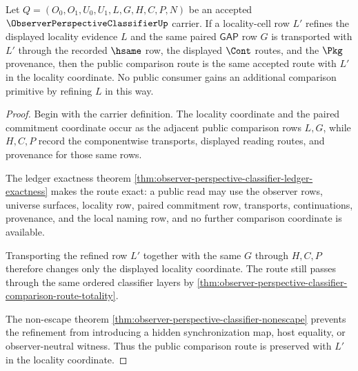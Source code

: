 \begin{theorem}
\label{thm:observer-perspective-classifier-locality-refinement}
Let $Q=(O_0,O_1,U_0,U_1,L,G,H,C,P,N)$ be an accepted $\ObserverPerspectiveClassifierUp$ carrier. If a locality-cell row $L'$ refines the displayed locality evidence $L$ and the same paired $\mathsf{GAP}$ row $G$ is transported with $L'$ through the recorded $\hsame$ row, the displayed $\Cont$ routes, and the $\Pkg$ provenance, then the public comparison route is the same accepted route with $L'$ in the locality coordinate. No public consumer gains an additional comparison primitive by refining $L$ in this way.
\end{theorem}
\begin{proof}
Begin with the carrier definition. The locality coordinate and the paired commitment coordinate occur as the adjacent public comparison rows $L,G$, while $H,C,P$ record the componentwise transports, displayed reading routes, and provenance for those same rows.

The ledger exactness theorem \autoref{thm:observer-perspective-classifier-ledger-exactness} makes the route exact: a public read may use the observer rows, universe surfaces, locality row, paired commitment row, transports, continuations, provenance, and the local naming row, and no further comparison coordinate is available.

Transporting the refined row $L'$ together with the same $G$ through $H,C,P$ therefore changes only the displayed locality coordinate. The route still passes through the same ordered classifier layers by \autoref{thm:observer-perspective-classifier-comparison-route-totality}.

The non-escape theorem \autoref{thm:observer-perspective-classifier-nonescape} prevents the refinement from introducing a hidden synchronization map, host equality, or observer-neutral witness. Thus the public comparison route is preserved with $L'$ in the locality coordinate.
\end{proof}

